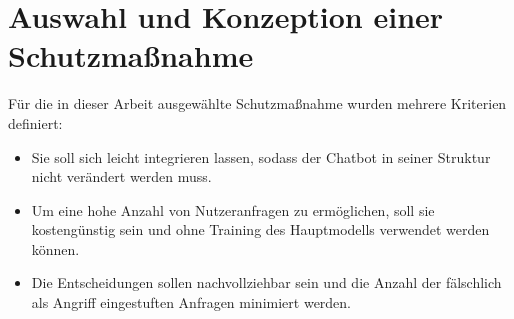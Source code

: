 \section{Auswahl und Konzeption einer Schutzmaßnahme}\label{konzept}

Für die in dieser Arbeit ausgewählte Schutzmaßnahme wurden mehrere Kriterien definiert:

\begin{itemize}
    \item Sie soll sich leicht integrieren lassen, sodass der Chatbot in seiner Struktur nicht verändert werden muss. 
    \item Um eine hohe Anzahl von Nutzeranfragen zu ermöglichen, soll sie kostengünstig sein und ohne Training des Hauptmodells verwendet werden können.
    \item Die Entscheidungen sollen nachvollziehbar sein und die Anzahl der fälschlich als Angriff eingestuften Anfragen minimiert werden.
\end{itemize}

